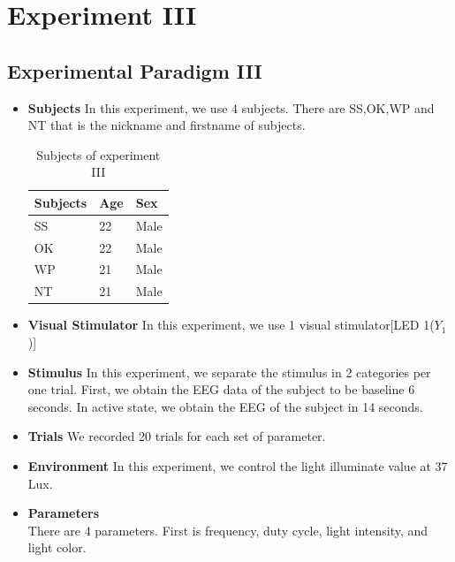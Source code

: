 \newpage
\section{Experiment III}
\subsection{Experimental Paradigm III}

\begin{itemize}
\item{\textbf{Subjects}}\newline
In this experiment, we use 4 subjects. There are SS,OK,WP and NT that is the nickname and firstname of subjects.

\begin{table}[ht]
\centering
\begin{tabular}{| P{.2\linewidth} | P{.2\linewidth} | P{.2\linewidth} |}
			\hline 
			\textbf{Subjects} & \textbf{Age}  & \textbf{Sex}\\
			\hline 
			SS & 22 & Male\\
			\hline 
			OK & 22 & Male\\
			\hline 
			WP & 21 & Male\\
			\hline 
			NT & 21 & Male\\
			\hline
		\end{tabular}       
\caption{Subjects of experiment III}
\label{table:2}
\end{table}

\item{\textbf{Visual Stimulator}}
In this experiment, we use 1 visual stimulator[LED 1($Y_1$)]
\item{\textbf{Stimulus}}
In this experiment, we separate the stimulus in 2 categories per one trial.
First, we obtain the EEG data of the subject to be baseline 6 seconds.
In active state, we obtain the EEG of the subject in 14 seconds.
\item{\textbf{Trials}}
We recorded 20 trials for each set of parameter.
\item{\textbf{Environment}}
In this experiment, we control the light illuminate value at 37 Lux.
\item{\textbf{Parameters}}\\
There are 4 parameters. First is frequency, duty cycle, light intensity, and light color.
\end{itemize}

